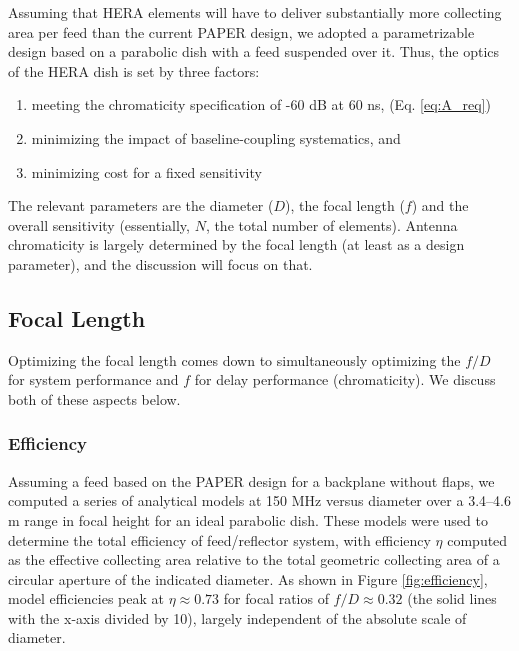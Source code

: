 \documentclass[11pt]{article}
\begin{document}
Assuming that HERA elements will have to deliver substantially more collecting area per feed
than the current PAPER design, we adopted a parametrizable design based on a parabolic dish
with a feed suspended over it.
Thus, the optics of the HERA dish is set by three factors:  
\begin{enumerate}
\item meeting the chromaticity specification of -60 dB at 60 ns,  (Eq. \ref{eq:A_req})
\item minimizing the impact of baseline-coupling systematics, and 
\item minimizing cost for a fixed sensitivity
\end{enumerate}
The relevant parameters are the diameter ($D$), the focal length ($f$) and the overall sensitivity (essentially, $N$, the total number of elements).  Antenna chromaticity is largely determined by the focal length (at least as a design parameter), and the discussion will focus on that.

 \subsection{Focal Length}
Optimizing the focal length comes down to simultaneously optimizing the $f/D$ for system performance and $f$ for delay performance (chromaticity).  We discuss both of these aspects below.

\subsubsection{Efficiency}
Assuming a feed based on the PAPER design for a backplane without flaps,
we computed a series of analytical models at 150 MHz versus diameter over a 3.4--4.6 m range in focal height
for an ideal parabolic dish.  These models were used to determine the total efficiency of
feed/reflector system, with efficiency $\eta$ computed as the effective collecting area
relative to the total geometric collecting area of a circular aperture of the
indicated diameter.
As shown in Figure \ref{fig:efficiency},
model efficiencies peak at $\eta\approx0.73$ for focal ratios of $f/D\approx0.32$ (the solid lines with the x-axis divided by 10), largely
independent of the absolute scale of diameter.
\end{document}
